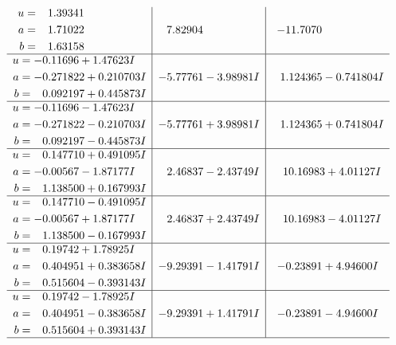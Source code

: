 \documentclass[1p]{elsarticle_modified}
\theoremstyle{definition}
\begin{document}
$$\begin{array}{c|c|c}
\begin{aligned}
u &= \phantom{-}1.39341\phantom{ +0.000000I} \\
a &= \phantom{-}1.71022\phantom{ +0.000000I} \\
b &= \phantom{-}1.63158\phantom{ +0.000000I}\end{aligned}
 & \phantom{-}7.82904\phantom{ +0.000000I} & -11.7070\phantom{ +0.000000I} \\ \hline\begin{aligned}
u &= -0.11696 + 1.47623 I \\
a &= -0.271822 + 0.210703 I \\
b &= \phantom{-}0.092197 + 0.445873 I\end{aligned}
 & -5.77761 - 3.98981 I & \phantom{-}1.124365 - 0.741804 I \\ \hline\begin{aligned}
u &= -0.11696 - 1.47623 I \\
a &= -0.271822 - 0.210703 I \\
b &= \phantom{-}0.092197 - 0.445873 I\end{aligned}
 & -5.77761 + 3.98981 I & \phantom{-}1.124365 + 0.741804 I \\ \hline\begin{aligned}
u &= \phantom{-}0.147710 + 0.491095 I \\
a &= -0.00567 - 1.87177 I \\
b &= \phantom{-}1.138500 + 0.167993 I\end{aligned}
 & \phantom{-}2.46837 - 2.43749 I & \phantom{-}10.16983 + 4.01127 I \\ \hline\begin{aligned}
u &= \phantom{-}0.147710 - 0.491095 I \\
a &= -0.00567 + 1.87177 I \\
b &= \phantom{-}1.138500 - 0.167993 I\end{aligned}
 & \phantom{-}2.46837 + 2.43749 I & \phantom{-}10.16983 - 4.01127 I \\ \hline\begin{aligned}
u &= \phantom{-}0.19742 + 1.78925 I \\
a &= \phantom{-}0.404951 + 0.383658 I \\
b &= \phantom{-}0.515604 - 0.393143 I\end{aligned}
 & -9.29391 - 1.41791 I & -0.23891 + 4.94600 I \\ \hline\begin{aligned}
u &= \phantom{-}0.19742 - 1.78925 I \\
a &= \phantom{-}0.404951 - 0.383658 I \\
b &= \phantom{-}0.515604 + 0.393143 I\end{aligned}
 & -9.29391 + 1.41791 I & -0.23891 - 4.94600 I\\
 \hline 
 \end{array}$$\newpage\newpage\renewcommand{\arraystretch}{1}
\end{document}
